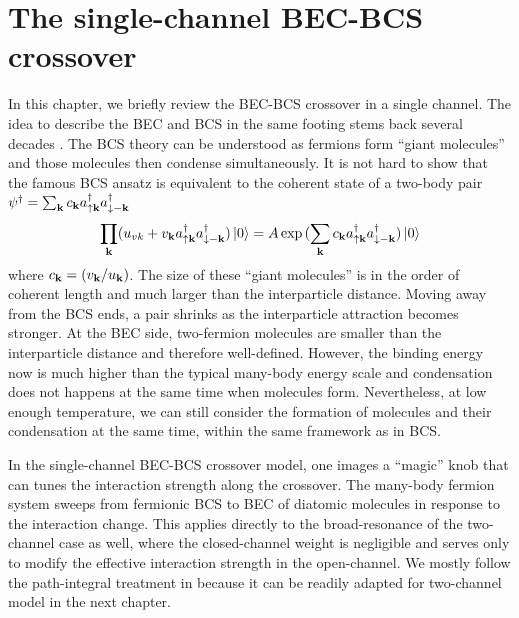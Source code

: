 \chapter{The single-channel BEC-BCS crossover\label{sec:intro:1channel}}
In this chapter, we briefly review the BEC-BCS crossover in a single channel.   The idea to describe the BEC and BCS in the same footing stems back several decades \cite{Eagle, LeggettCrossover, Nozieres, RanderiaBEC}.  %
The BCS theory can be understood as fermions form  ``giant molecules'' and those molecules then condense simultaneously.    It is not hard to show that the famous BCS ansatz is equivalent to  the  coherent state of a two-body pair $\psi^{\dagger}=\sum_{\mathbf{k}}c_{\mathbf{k}}a^{\dagger}_{\uparrow\mathbf{k}}a^{\dagger}_{\downarrow-\mathbf{k}}$
\begin{equation}\label{eq:intro:BCScoherent}
\prod_{\mathbf{k}}(u_{vk}+v_{\mathbf{k}}a^{\dagger}_{\uparrow\mathbf{k}}a^{\dagger}_{\downarrow-\mathbf{k}})\left|0\right>=A\exp{}(\sum_{\mathbf{k}}c_{\mathbf{k}}a^{\dagger}_{\uparrow\mathbf{k}}a^{\dagger}_{\downarrow-\mathbf{k}})\left|0\right>
\end{equation}
where $c_{\mathbf{k}}=( v_{\mathbf{k}}/u_{\mathbf{k}})$. The size of these ``giant molecules'' is in the order of coherent length and much larger than the interparticle distance.
Moving away from the BCS ends, a pair shrinks as the interparticle attraction becomes stronger.  At the BEC side, two-fermion molecules are smaller than the interparticle distance and therefore well-defined. However, the binding energy now is much higher than the typical many-body energy scale and condensation does not happens at the same time when molecules form.  Nevertheless,  at low enough temperature, we can still consider the formation of molecules and their condensation  at the same time, within the same framework as in BCS.  

In the single-channel BEC-BCS crossover model, one images a ``magic'' knob that can tunes the interaction strength along the crossover.  The many-body fermion  system sweeps from fermionic BCS to BEC of diatomic molecules  in response to the interaction change.   This applies directly to the broad-resonance of the two-channel case as well, where the closed-channel weight is negligible and serves only to modify the effective interaction strength in the open-channel.  We mostly follow the path-integral treatment in \cite{RanderiaBEC, Randeria1997, Randeria2008} because it can be readily adapted for two-channel model in the next chapter.




\begin{subappendices}
\end{subappendices}

